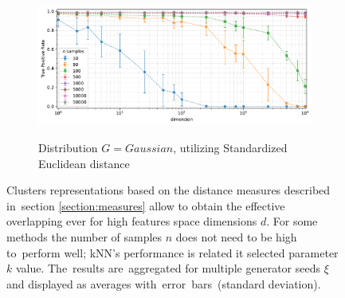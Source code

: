 \begin{figure}[t]
    \vspace{-0.75em}
    \begin{subfigure}[b]{0.9\textwidth}
        \centering
        \caption{\small Distribution $G = Gaussian$, utilizing Standardized Euclidean distance}
        \includegraphics[width=\textwidth]{images/overlapping/trend-distributions-sens_99(dimension)-distance_1-distribution_gaussian-model_SED-samples_10,50,100,500,1000,5000,10000,50000-aggregated.pdf}
        \label{fig:tpr-gaussian-sed}
    \end{subfigure}

    \vspace{-0.5em}
    \caption{Clusters representations based on the distance measures described in~section \ref{section:measures} allow to obtain the effective overlapping ever for high features space dimensions $d$. For some methods the number of samples $n$ does not need to be high to~perform well; kNN's performance is related it selected parameter $k$ value. The~results are~aggregated for multiple generator seeds $\xi$ and displayed as averages with~error~bars~(standard deviation).}
    \label{fig:overlapping-3}
    \vspace{-3.2em}
\end{figure}

\cleardoublepage{}
